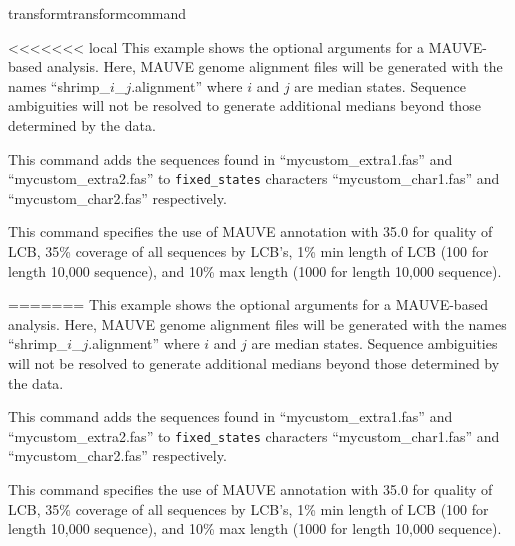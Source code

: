 \begin{command}{transform}{transformcommand}
\begin{poyexamples}
<<<<<<< local
		{This example shows the optional arguments for a MAUVE-based  analysis.
		Here, MAUVE genome alignment files will be generated with the names ``shrimp\_$i$\_$j$.alignment'' 
		where $i$ and $j$ are median states.  Sequence ambiguities will not be resolved to generate 
		additional medians beyond those determined by the data.}
		
		{This command adds the sequences found in ``mycustom\_extra1.fas'' and ``mycustom\_extra2.fas'' 
		to \texttt{fixed\_states} characters 
		``mycustom\_char1.fas'' and ``mycustom\_char2.fas'' respectively.}
	         	
		{This command specifies the use of MAUVE annotation with 35.0 for quality of LCB,
		35\% coverage of all sequences by LCB's, 1\% min length of LCB (100 for length 10,000 
		sequence), and 10\% max length (1000 for length 10,000 sequence).}
		
=======
            {This example shows the optional arguments for a MAUVE-based  analysis.
            Here, MAUVE genome alignment files will be generated with the names ``shrimp\_$i$\_$j$.alignment'' 
            where $i$ and $j$ are median states.  Sequence ambiguities will not be resolved to generate 
            additional medians beyond those determined by the data.}
        
            {This command adds the sequences found in ``mycustom\_extra1.fas'' and ``mycustom\_extra2.fas'' 
            to \texttt{fixed\_states} characters 
            ``mycustom\_char1.fas'' and ``mycustom\_char2.fas'' respectively.}
                 
            {This command specifies the use of MAUVE annotation with 35.0 for quality of LCB,
            35\% coverage of all sequences by LCB's, 1\% min length of LCB (100 for length 10,000 
            sequence), and 10\% max length (1000 for length 10,000 sequence).}
        

\end{poyexamples}
\end{command}
